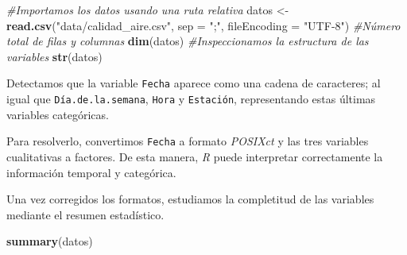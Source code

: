 \documentclass[notspecified,article,submit,oneauthor,pdftex]{Definitions/mdpi}
\newenvironment{Shaded}{\begin{snugshade}}{\end{snugshade}}
\newcommand{\AttributeTok}[1]{\textcolor[rgb]{0.13,0.29,0.53}{#1}}
\newcommand{\CommentTok}[1]{\textcolor[rgb]{0.56,0.35,0.01}{\textit{#1}}}
\newcommand{\FunctionTok}[1]{\textcolor[rgb]{0.13,0.29,0.53}{\textbf{#1}}}
\newcommand{\NormalTok}[1]{#1}
\newcommand{\OtherTok}[1]{\textcolor[rgb]{0.56,0.35,0.01}{#1}}
\newcommand{\SpecialCharTok}[1]{\textcolor[rgb]{0.81,0.36,0.00}{\textbf{#1}}}
\newcommand{\StringTok}[1]{\textcolor[rgb]{0.31,0.60,0.02}{#1}}
\begin{document}
\begin{Shaded}
\begin{Highlighting}[]
\CommentTok{\#Importamos los datos usando una ruta relativa }
\NormalTok{datos }\OtherTok{\textless{}{-}} \FunctionTok{read.csv}\NormalTok{(}\StringTok{"data/calidad\_aire.csv"}\NormalTok{, }\AttributeTok{sep =} \StringTok{";"}\NormalTok{, }\AttributeTok{fileEncoding =} \StringTok{"UTF{-}8"}\NormalTok{)}
\CommentTok{\#Número total de filas y columnas}
\FunctionTok{dim}\NormalTok{(datos)}
\CommentTok{\#Inspeccionamos la estructura de las variables}
\FunctionTok{str}\NormalTok{(datos)}
\end{Highlighting}
\end{Shaded}

Detectamos que la variable \texttt{Fecha} aparece como una cadena de
caracteres; al igual que \texttt{Día.de.la.semana}, \texttt{Hora} y
\texttt{Estación}, representando estas últimas variables categóricas.

Para resolverlo, convertimos \texttt{Fecha} a formato \emph{POSIXct} y
las tres variables cualitativas a factores. De esta manera, \emph{R}
puede interpretar correctamente la información temporal y categórica.

\begin{Shaded}
\end{Shaded}

Una vez corregidos los formatos, estudiamos la completitud de las
variables mediante el resumen estadístico.

\begin{Shaded}
\begin{Highlighting}[]
\FunctionTok{summary}\NormalTok{(datos)}
\end{Highlighting}
\end{Shaded}
\end{document}
